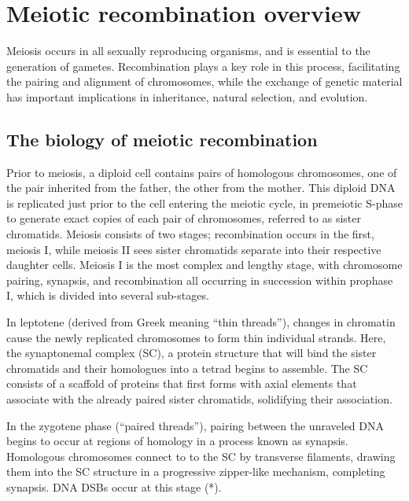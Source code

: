 
\section{Meiotic recombination overview}

Meiosis occurs in all sexually reproducing organisms, and is essential to the generation of gametes.
Recombination plays a key role in this process, facilitating the pairing and alignment of chromosomes, while the exchange of genetic material has important implications in inheritance, natural selection, and evolution.

\subsection{The biology of meiotic recombination}

Prior to meiosis, a diploid cell contains pairs of homologous chromosomes, one of the pair inherited from the father, the other from the mother.
This diploid DNA is replicated just prior to the cell entering the meiotic cycle, in premeiotic S-phase\cite{Bell2002} to generate exact copies of each pair of chromosomes, referred to as sister chromatids.
Meiosis consists of two stages; recombination occurs in the first, meiosis I, while meiosis II sees sister chromatids separate into their respective daughter cells.
Meiosis I is the most complex and lengthy stage, with chromosome pairing, synapsis, and recombination all occurring in succession within prophase I, which is  divided into several sub-stages.

In leptotene (derived from Greek meaning ``thin threads''), changes in chromatin cause the newly replicated chromosomes to form thin individual strands.
Here, the synaptonemal complex (SC), a protein structure that will bind the sister chromatids and their homologues into a tetrad begins to assemble.
The SC consists of a scaffold of proteins that first forms with axial elements that associate with the already paired sister chromatids, solidifying their association.

In the zygotene phase (``paired threads''), pairing between the unraveled DNA begins to occur at regions of homology in a process known as synapsis.
Homologous chromosomes connect to to the SC by transverse filaments, drawing them into the SC structure in a progressive zipper-like mechanism, completing synapsis\cite{Yang2009}.
DNA DSBs occur at this stage (*).

